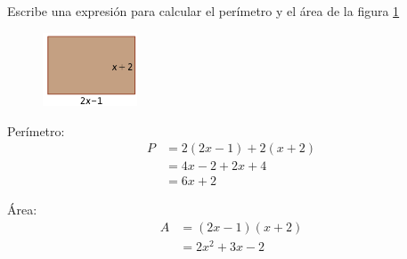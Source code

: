 Escribe una expresión para calcular el perímetro y el área de la figura \ref{fig:20230319035140}

\begin{figure}[H]
    \centering
    \includegraphics[width=0.25\textwidth]{../images/20230319035140}
    \caption{}
    \label{fig:20230319035140}
\end{figure}


\begin{solutionbox}{3.5cm}
    \begin{multicols}{2}
      Perímetro:
      \begin{align*}
        P & =2(2x-1)+2(x+2) \\
          & =4x-2+2x+4     \\
          & =6x+2
      \end{align*}
  
      Área:
      \begin{align*}
        A & =(2x-1)(x+2)     \\
          & =2x^2+3x-2
      \end{align*}
    \end{multicols}
  \end{solutionbox}